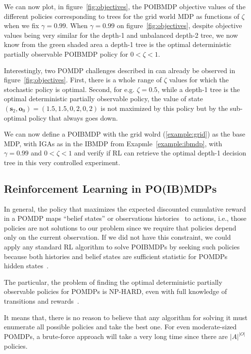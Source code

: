 We can now plot, in figure~\ref{fig:objectives}, the POIBMDP objective values of the different policies corresponding to trees for the grid world MDP as functions of $\zeta$ when we fix $\gamma=0.99$. 
When $\gamma=0.99$ on figure~\ref{fig:objectives}, despite objective values being very similar for the depth-1 and unbalanced depth-2 tree, we now know from the green shaded area {\color{blue}a depth-1 tree is the optimal deterministic partially observable POIBMDP policy for $0< \zeta < 1$}.

Interestingly, two POMDP challenges described in \cite{learning-pomdp} can already be observed in figure~\ref{fig:objectives}. 
First, there is a whole range of $\zeta$ values for which the stochastic policy is optimal.
Second, for e.g. $\zeta=0.5$, while a depth-1 tree is the optimal deterministic partially observable policy, the value of state $(\boldsymbol{s}_2, \boldsymbol{o}_0) = (1.5, 1.5, 0, 2, 0, 2)$ is not maximized by this policy but by the sub-optimal policy that always goes down.

We can now define a POIBMDP with the grid wolrd (\ref{example:grid}) as the base MDP, with IGAs as in the IBMDP from Exapmle~\ref{example:ibmdp}, with $\gamma=0.99$ and $0<\zeta<1$ and verify if RL can retrieve the optimal depth-1 decision tree in this very controlled experiment.

\subsection{Reinforcement Learning in PO(IB)MDPs}

In general, the policy that maximizes the expected discounted cumulative reward in a POMDP maps ``belief states'' or observations histories~\cite{chap2} to actions, i.e., those policies are not solutions to our problem since we require that policies depend only on the current observation.
If we did not have this constraint, we could apply any standard RL algorithm to solve POIBMDPs by seeking such policies because both histories and belief states are sufficient statistic for POMDPs hidden states~\cite{chap2,lambrechts2025informed}.

The particular, the problem of finding the optimal deterministic partially observable policies for POMDPs is NP-HARD, even with full knowledge of transitions and rewards~\cite[section 3.2]{littman1}. 

It means that, there is no reason to believe that any algorithm for solving it must enumerate all possible policies and take the best one. 
For even moderate-sized POMDPs, a brute-force approach will take a very long time since there are $|A|^{|O|}$ policies.

